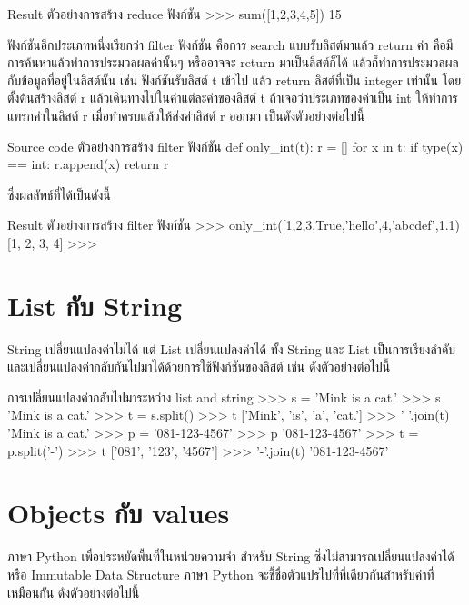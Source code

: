 \begin{codelist}{Result ตัวอย่างการสร้าง reduce ฟังก์ชัน}{}
>>> sum([1,2,3,4,5])
15
\end{codelist}


ฟังก์ชันอีกประเภทหนึ่งเรียกว่า filter ฟังก์ชัน คือการ search แบบรับลิสต์มาแล้ว return ค่า คือมีการค้นหาแล้วทำการประมวลผลค่านั้นๆ หรืออาจจะ return มาเป็นลิสต์ก็ได้ แล้วก็ทำการประมวลผลกับข้อมูลที่อยู่ในลิสต์นั้น เช่น ฟังก์ชันรับลิสต์ t เข้าไป แล้ว return ลิสต์ที่เป็น integer เท่านั้น โดยตั้งต้นสร้างลิสต์ r แล้วเดินทางไปในค่าแต่ละค่าของลิสต์ t ถ้าเจอว่าประเภทของค่าเป็น int ให้ทำการแทรกค่าในลิสต์ r เมื่อทำครบแล้วให้ส่งค่าลิสต์ r ออกมา เป็นดังตัวอย่างต่อไปนี้

\begin{codelist}{Source code ตัวอย่างการสร้าง filter ฟังก์ชัน}{}
def only_int(t):
    r = []
    for x in t:
        if type(x) == int: r.append(x)
    return r
\end{codelist}

ซึ่งผลลัพธ์ที่ได้เป็นดังนี้

\begin{codelist}{Result ตัวอย่างการสร้าง filter ฟังก์ชัน}{}
>>> only_int([1,2,3,True,'hello',4,'abcdef',1.1)
[1, 2, 3, 4]
>>>
\end{codelist}

\section{List กับ String}

String เปลี่ยนแปลงค่าไม่ได้ แต่ List เปลี่ยนแปลงค่าได้ ทั้ง String และ List เป็นการเรียงลำดับและเปลี่ยนแปลงค่ากลับกันไปมาได้ด้วยการใช้ฟังก์ชันของลิสต์ เช่น  ดังตัวอย่างต่อไปนี้

\begin{codelist}{การเปลี่ยนแปลงค่ากลับไปมาระหว่าง list and string}{}
>>> s = 'Mink is a cat.'
>>> s
'Mink is a cat.'
>>> t = s.split()
>>> t
['Mink', 'is', 'a', 'cat.']
>>> ' '.join(t)
'Mink is a cat.'
>>> p = '081-123-4567'
>>> p
'081-123-4567'
>>> t = p.split('-')
>>> t
['081', '123', '4567']
>>> '-'.join(t)
'081-123-4567'
\end{codelist}


\section{Objects กับ values}

ภาษา Python เพื่อประหยัดพื้นที่ในหน่วยความจำ สำหรับ String ซึ่งไม่สามารถเปลี่ยนแปลงค่าได้ หรือ Immutable Data Structure ภาษา Python จะชี้ชื่อตัวแปรไปที่ที่เดียวกันสำหรับค่าที่เหมือนกัน  ดังตัวอย่างต่อไปนี้

